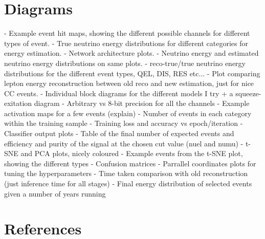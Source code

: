 \section{Diagrams}

- Example event hit maps, showing the different possible channels for different types of event.
- True neutrino energy distributions for different categories for energy estimation.
- Network architecture plots.
- Neutrino energy and estimated neutrino energy distributions on same plots.
- reco-true/true neutrino energy distributions for the different event types, QEL, DIS, RES etc...
- Plot comparing lepton energy reconstruction between old reco and new estimation, just for nice CC events.
- Individual block diagrams for the different models I try + a squeeze-exitation diagram
- Arbitrary vs 8-bit precision for all the channels
- Example activation maps for a few events (explain)
- Number of events in each category within the training sample
- Training loss and accuracy vs epoch/iteration
- Classifier output plots
- Table of the final number of expected events and efficiency and purity of the signal at the chosen cut value (nuel and numu)
- t-SNE and PCA plots, nicely coloured
- Example events from the t-SNE plot, showing the different types
- Confusion matrices
- Parrallel coordinates plots for tuning the hyperparameters
- Time taken comparison with old reconstruction (just inference time for all stages)
- Final energy distribution of selected events given a number of years running

\section{References}

